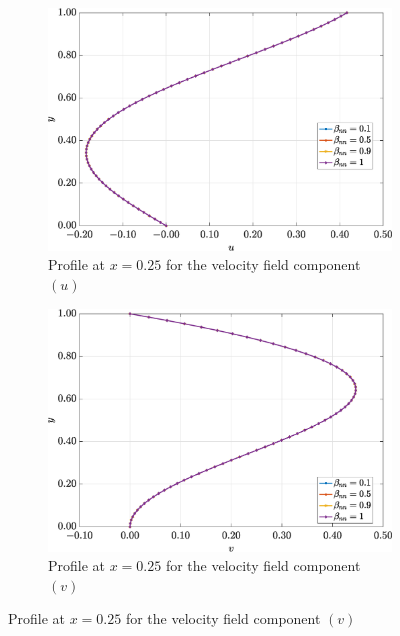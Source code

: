 \documentclass[preprint, 12pt]{elsarticle}
\begin{document}
\begin{figure}[H]
    \centering
    \begin{subfigure}[b]{.46\textwidth}
        \includegraphics[width=\textwidth]{Slice_x_Tog_Numerical_NormErr_2nd_Betann_1_Re_1000_Wi_1_epsilon_0_xi_0_alphaG_0_Dt_1e-06_at_0.05_tipsim_1_MMS_12_x0.25y0.25_U.eps}
        \caption{Profile at $x=0.25$ for the velocity field component $(u)$}
        \label{fig_slice_x_u_2nd_Case1_oldroydB}
    \end{subfigure}
    \vspace{0.2cm}
    \qquad
    \begin{subfigure}[b]{.46\textwidth}
        \includegraphics[width=\textwidth]{Slice_x_Tog_Numerical_NormErr_2nd_Betann_1_Re_1000_Wi_1_epsilon_0_xi_0_alphaG_0_Dt_1e-06_at_0.05_tipsim_1_MMS_12_x0.25y0.25_V.eps}
        \caption{Profile at $x=0.25$ for the velocity field component $(v)$}

\end{subfigure}
\end{figure}
\end{document}
